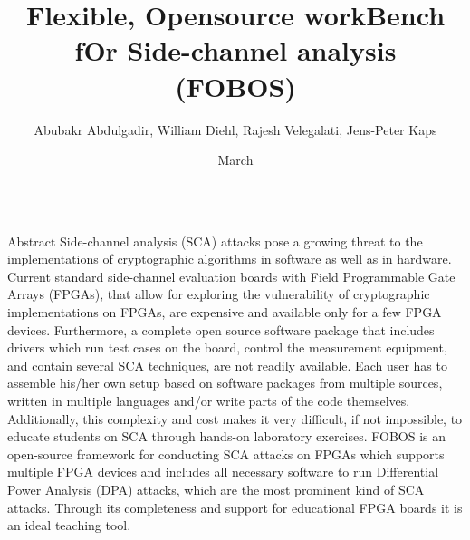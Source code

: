 \documentclass[xcolor=pdftex,dvipsnames,table,final]{beamer}
\title{\LARGE Flexible, Opensource workBench fOr Side-channel analysis\\ \vspace{0.5ex}(FOBOS)}
\author{Abubakr Abdulgadir, William Diehl, Rajesh Velegalati, Jens-Peter Kaps}%
\institute{\vspace{-1ex}Department of Electrical and Computer Engineering, George Mason University, Fairfax, Virginia 22030, USA
          } %
\date{March}
\begin{document}
\begin{frame}[fragile]{} 
  \begin{columns}[t]
    \begin{column}{.31\linewidth}

      \begin{block}{Abstract}
Side-channel analysis (SCA) attacks pose a growing threat to the
implementations of cryptographic algorithms in software as well as in
hardware. Current standard side-channel evaluation boards with Field
Programmable Gate Arrays (FPGAs), that allow for exploring the
vulnerability of cryptographic implementations on FPGAs, are expensive
and available only for a few FPGA devices. Furthermore, a complete
open source software package that includes drivers which run test cases
on the board, control the measurement equipment, and contain several
SCA techniques, are not readily available. Each user has to assemble
his/her own setup based on software packages from multiple sources,
written in multiple languages and/or write parts of the code
themselves. Additionally, this complexity and cost makes it very
difficult, if not impossible, to educate students on SCA through
hands-on laboratory exercises. 
FOBOS is an open-source framework for
conducting SCA attacks on FPGAs which supports multiple FPGA devices
and includes all necessary software to run Differential Power Analysis
(DPA) attacks, which are the most prominent kind of SCA attacks.
Through its completeness and support for educational FPGA boards it is
an ideal teaching tool.


      \end{block}
	 

     


\end{column}
\end{columns}
\end{frame}
\end{document}
